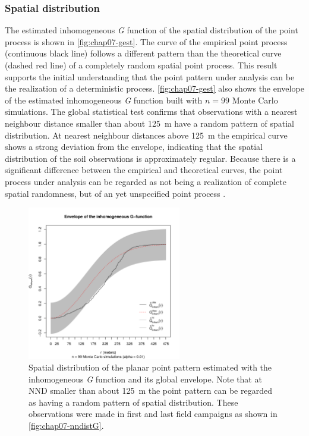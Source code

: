 \subsubsection{Spatial distribution}

The estimated inhomogeneous \emph{G} function of the spatial distribution of the point process is shown in 
\autoref{fig:chap07-gest}. The curve of the empirical point process (continuous black line) follows a 
different pattern than the theoretical curve (dashed red line) of a completely random spatial point 
process. This result supports the initial understanding that the point pattern under analysis can be the 
realization of a deterministic process. \autoref{fig:chap07-gest} also shows the envelope of the estimated 
inhomogeneous \emph{G} function built with $n = 99$ Monte Carlo simulations. The global statistical 
test confirms that observations with a nearest neighbour distance smaller than about \SI{125}{\m} have a 
random pattern of spatial distribution. At nearest neighbour distances above \SI{125}{\m} the empirical curve 
shows a strong deviation from the envelope, indicating that the spatial distribution of the soil observations 
is approximately regular. Because there is a significant difference between the empirical and theoretical 
curves, the point process under analysis can be regarded as not being a realization of complete spatial 
randomness, but of an yet unspecified point process \cite{Baddeley2010}.

\begin{figure}[!ht]
\centering
\includegraphics[trim=0mm 0mm 0mm 38mm, clip=true, width=0.6\textwidth]{fig/chap07-gest-sim}
\caption[Estimated inhomogeneous \emph{G} function and its global envelope.]{Spatial distribution of the planar 
point pattern estimated with the inhomogeneous \emph{G} function and its global envelope. Note that at NND 
smaller than about \SI{125}{\m} the point pattern can be regarded as having a random pattern of spatial 
distribution. These observations were made in first and last field campaigns as shown in 
\autoref{fig:chap07-nndistG}.}
\label{fig:chap07-gest}
\end{figure}

